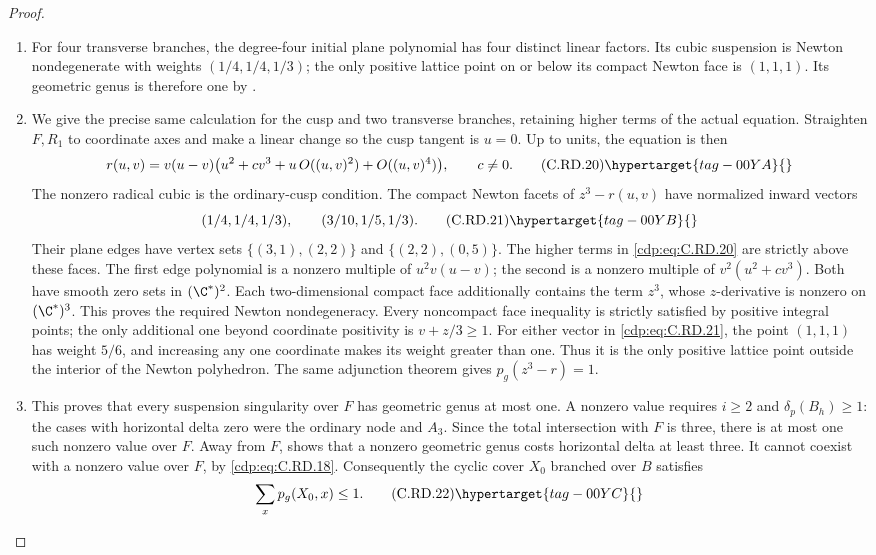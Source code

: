 \begin{proof}
\begin{enumerate}[label={$\langle1\rangle$\arabic*.},leftmargin=*]
\item For four transverse branches, the degree-four
initial plane polynomial has four distinct
linear factors. Its cubic suspension is Newton
nondegenerate with weights $(1/4,1/4,1/3)$;
the only positive lattice point on or below
its compact Newton face is $(1,1,1)$. Its
geometric genus is therefore one by
\cite[Theorem 2.1.1 and Corollary 2.1.3]{MerleTeissier1977}.

\item We give the precise same calculation for the cusp
and two transverse branches, retaining higher
terms of the actual equation. Straighten $F,R_1$
to coordinate axes and make a linear change so
the cusp tangent is $u=0$. Up to units, the
equation is then
\[
 r(u,v)=v(u-v)\bigl(u^2+c v^3+
           u\,O((u,v)^2)+O((u,v)^4)\bigr),
                  \qquad c\ne0.
\tag{C.RD.20}\hypertarget{tag-00YA}{}\label{cdp:eq:C.RD.20}
\]
The nonzero radical cubic is the ordinary-cusp
condition. The compact Newton facets of
$z^3-r(u,v)$ have normalized inward vectors
\[
             (1/4,1/4,1/3),\qquad
             (3/10,1/5,1/3).
\tag{C.RD.21}\hypertarget{tag-00YB}{}\label{cdp:eq:C.RD.21}
\]
Their plane edges have vertex sets
$\{(3,1),(2,2)\}$ and
$\{(2,2),(0,5)\}$. The higher terms in
\eqref{cdp:eq:C.RD.20} are strictly above these faces.
The first edge polynomial is a nonzero multiple
of $u^2v(u-v)$; the second is a nonzero multiple
of $v^2(u^2+c v^3)$. Both have smooth zero sets
in $(\C^*)^2$. Each two-dimensional compact
face additionally contains the term $z^3$,
whose $z$-derivative is nonzero on $(\C^*)^3$.
This proves the required Newton nondegeneracy.
Every noncompact face inequality is strictly
satisfied by positive integral points; the only
additional one beyond coordinate positivity is
$v+z/3\ge1$.
For either vector in \eqref{cdp:eq:C.RD.21}, the point
$(1,1,1)$ has weight $5/6$, and increasing any
one coordinate makes its weight greater than
one. Thus it is the only positive lattice
point outside the interior of the Newton
polyhedron. The same adjunction theorem gives
$p_g(z^3-r)=1$.

\item This proves that every suspension singularity
over $F$ has geometric genus at most one.
A nonzero value requires $i\ge2$ and
$\delta_p(B_h)\ge1$: the cases with horizontal
delta zero were the ordinary node and $A_3$.
Since the total intersection with $F$ is three,
there is at most one such nonzero value over
$F$. Away from $F$,  shows that a
nonzero geometric genus costs horizontal delta
at least three. It cannot coexist with a
nonzero value over $F$, by \eqref{cdp:eq:C.RD.18}.
Consequently the cyclic cover $X_0$ branched
over $B$ satisfies
\[
                        \sum_x p_g(X_0,x)\le1.
\tag{C.RD.22}\hypertarget{tag-00YC}{}\label{cdp:eq:C.RD.22}
\]


\end{enumerate}
\end{proof}
